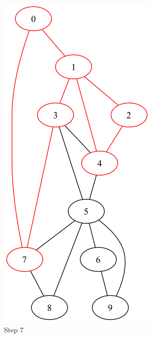 \documentclass[a4paper,11pt]{report}
\begin{document}
\begin{figure}[htbp]
    \begin{subfigure}[b]{0.3\textwidth}
        \includegraphics[height=0.29\textheight]{notebook/assets/aufgabe_07_fleury_step_6.png}
        \caption{Step 7}
        \label{fig:fleury_step_7}
    \end{subfigure}
    \hfill
    \begin{subfigure}[b]{0.3\textwidth}

\end{subfigure}
\end{figure}
\end{document}
